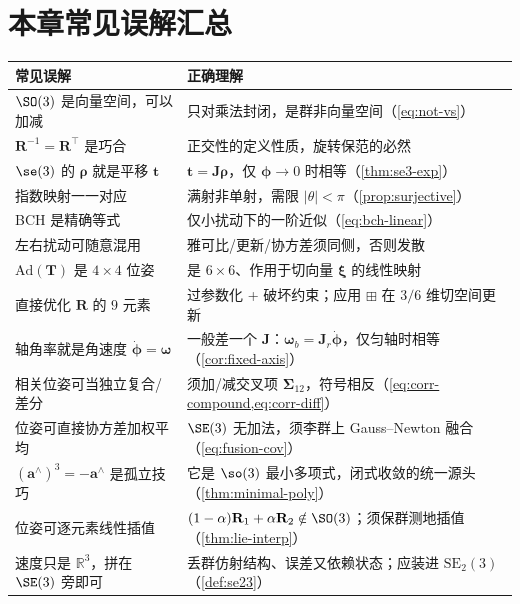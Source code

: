 \section*{本章常见误解汇总}
\begin{table}[H]\centering\small
\begin{tabular}{p{} p{}}
\toprule
\textbf{常见误解} & \textbf{正确理解} \\
\midrule
$\SO(3)$ 是向量空间，可以加减 & 只对乘法封闭，是群非向量空间（\cref{eq:not-vs}）\\
$\mathbf{R}^{-1}=\mathbf{R}^\top$ 是巧合 & 正交性的定义性质，旋转保范的必然 \\
$\se(3)$ 的 $\boldsymbol{\rho}$ 就是平移 $\mathbf{t}$ & $\mathbf{t}=\mathbf{J}\boldsymbol{\rho}$，仅 $\boldsymbol{\phi}\to0$ 时相等（\cref{thm:se3-exp}）\\
指数映射一一对应 & 满射非单射，需限 $|\theta|<\pi$（\cref{prop:surjective}）\\
BCH 是精确等式 & 仅小扰动下的一阶近似（\cref{eq:bch-linear}）\\
左右扰动可随意混用 & 雅可比/更新/协方差须同侧，否则发散 \\
$\mathrm{Ad}(\mathbf{T})$ 是 $4\times4$ 位姿 & 是 $6\times6$、作用于切向量 $\boldsymbol{\xi}$ 的线性映射 \\
直接优化 $\mathbf{R}$ 的 $9$ 元素 & 过参数化 + 破坏约束；应用 $\boxplus$ 在 $3/6$ 维切空间更新 \\
轴角率就是角速度 $\dot{\boldsymbol{\phi}}=\boldsymbol{\omega}$ & 一般差一个 $\mathbf{J}$：$\boldsymbol{\omega}_b=\mathbf{J}_r\dot{\boldsymbol{\phi}}$，仅匀轴时相等（\cref{cor:fixed-axis}）\\
相关位姿可当独立复合/差分 & 须加/减交叉项 $\boldsymbol{\Sigma}_{12}$，符号相反（\cref{eq:corr-compound,eq:corr-diff}）\\
位姿可直接协方差加权平均 & $\SE(3)$ 无加法，须李群上 Gauss--Newton 融合（\cref{eq:fusion-cov}）\\
$(\mathbf{a}^\wedge)^3=-\mathbf{a}^\wedge$ 是孤立技巧 & 它是 $\so(3)$ 最小多项式，闭式收敛的统一源头（\cref{thm:minimal-poly}）\\
位姿可逐元素线性插值 & $(1-\alpha)\mathbf{R}_1+\alpha\mathbf{R}_2\notin\SO(3)$；须保群测地插值（\cref{thm:lie-interp}）\\
速度只是 $\mathbb{R}^3$，拼在 $\SE(3)$ 旁即可 & 丢群仿射结构、误差又依赖状态；应装进 $\mathrm{SE}_2(3)$（\cref{def:se23}）\\
\bottomrule
\end{tabular}
\end{table}

